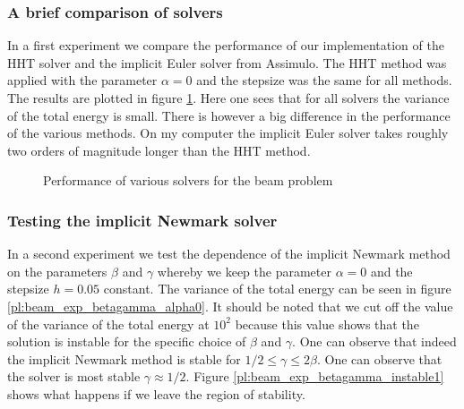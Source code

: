 \documentclass{report}
\newcounter{constant}
\begin{document}
\subsubsection*{A brief comparison of solvers}

In a first experiment we compare the performance of our implementation of the HHT solver and the implicit Euler solver from Assimulo. The HHT method was applied with the parameter $\alpha=0$ and the stepsize was the same for all methods. The results are plotted in figure \ref{tb:beam_exp_solverComparison}. Here one sees that for all solvers the variance of the total energy is small. There is however a big difference in the performance of the various methods. On my computer the implicit Euler solver takes roughly two orders of magnitude longer than the HHT method.

\begin{figure}[h]
\centering

\caption{Performance of various solvers for the beam problem}
\label{tb:beam_exp_solverComparison}
\end{figure}


\subsubsection*{Testing the implicit Newmark solver}

In a second experiment we test the dependence of the implicit Newmark method on the parameters $\beta$ and $\gamma$ whereby we keep the parameter $\alpha=0$ and the stepsize $h=0.05$ constant. The variance of the total energy can be seen in figure \ref{pl:beam_exp_betagamma_alpha0}. It should be noted that we cut off the value of the variance of the total energy at $10^2$ because this value shows that the solution is instable for the specific choice of $\beta$ and $\gamma$. One can observe that indeed the implicit Newmark method is stable for $1/2\leq\gamma\leq2\beta$.
One can observe that the solver is most stable $\gamma\approx1/2$. Figure \ref{pl:beam_exp_betagamma_instable1} shows what happens if we leave the region of stability.
\end{document}
